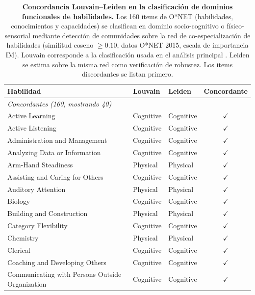\begin{table}[htbp]
\centering\small
\caption{\textbf{Concordancia Louvain--Leiden en la clasificación de dominios funcionales de habilidades.} Los 160 items de O*NET (habilidades, conocimientos y capacidades) se clasifican en dominio socio-cognitivo o físico-sensorial mediante detección de comunidades sobre la red de co-especialización de habilidades (similitud coseno $\geq 0.10$, datos O*NET 2015, escala de importancia IM). Louvain corresponde a la clasificación usada en el análisis principal \parencite{alabdulkareem_unpacking_2018}. Leiden se estima sobre la misma red como verificación de robustez. Los items discordantes se listan primero.}
\label{tab:leiden_concordance}
\begin{tabular}{p{5.8cm} l l c}
\toprule
Habilidad & Louvain & Leiden & Concordante \\
\midrule
\multicolumn{4}{l}{\textit{Concordantes (160, mostrando 40)}} \\[2pt]
  Active Learning & Cognitive & Cognitive & $\checkmark$ \\
  Active Listening & Cognitive & Cognitive & $\checkmark$ \\
  Administration and Management & Cognitive & Cognitive & $\checkmark$ \\
  Analyzing Data or Information & Cognitive & Cognitive & $\checkmark$ \\
  Arm-Hand Steadiness & Physical & Physical & $\checkmark$ \\
  Assisting and Caring for Others & Cognitive & Cognitive & $\checkmark$ \\
  Auditory Attention & Physical & Physical & $\checkmark$ \\
  Biology & Cognitive & Cognitive & $\checkmark$ \\
  Building and Construction & Physical & Physical & $\checkmark$ \\
  Category Flexibility & Cognitive & Cognitive & $\checkmark$ \\
  Chemistry & Physical & Physical & $\checkmark$ \\
  Clerical & Cognitive & Cognitive & $\checkmark$ \\
  Coaching and Developing Others & Cognitive & Cognitive & $\checkmark$ \\
  Communicating with Persons Outside Organization & Cognitive & Cognitive & $\checkmark$ \\

\end{tabular}
\end{table}
